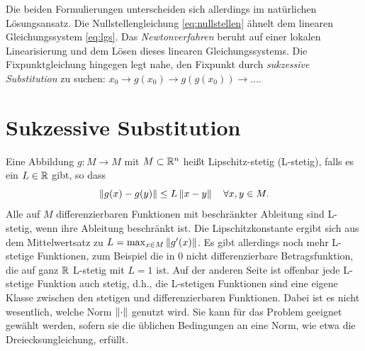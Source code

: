 Die beiden Formulierungen unterscheiden sich allerdings im natürlichen
Lösungsansatz. Die Nullstellengleichung \eqref{eq:nullstellen} ähnelt
dem linearen Gleichungssystem \eqref{eq:lgs}. Das
\emph{Newtonverfahren} beruht auf einer lokalen Linearisierung und dem
Lösen dieses linearen Gleichungssystems. Die Fixpunktgleichung
hingegen legt nahe, den Fixpunkt durch \emph{sukzessive Substitution}
zu suchen: $x_0\to g(x_0)\to g(g(x_0))\to\ldots$.

\section{Sukzessive Substitution}

Eine Abbildung $g:M\to M$ mit $M\subset\mathbb{R}^n$ heißt Lipschitz-stetig
(L-stetig), falls es ein $L\in\mathbb{R}$ gibt, so dass
\begin{equation}
  \left\lVert{g(x) - g(y)}\right\rVert \le L \left\lVert{x - y}\right\rVert\quad\forall x,y\in M.
\end{equation}
Alle auf $M$ differenzierbaren Funktionen mit beschränkter Ableitung
sind L-stetig, wenn ihre Ableitung beschränkt ist. Die
Lipschitzkonstante ergibt sich aus dem Mittelwertsatz zu $L=\max_{x\in
  M}\left\lVert{g'(x)}\right\rVert$.  Es gibt allerdings noch mehr L-stetige Funktionen,
zum Beispiel die in 0 nicht differenzierbare Betragsfunktion, die auf
ganz $\mathbb{R}$ L-stetig mit $L = 1$ ist. Auf der anderen Seite ist
offenbar jede L-stetige Funktion auch stetig, d.h., die L-stetigen
Funktionen sind eine eigene Klasse zwischen den stetigen und
differenzierbaren Funktionen. Dabei ist es nicht wesentlich, welche
Norm $\left\lVert{\cdot}\right\rVert$ genutzt wird. Sie kann für das Problem geeignet
gewählt werden, sofern sie die üblichen Bedingungen an eine Norm, wie
etwa die Dreiecksungleichung, erfüllt.

